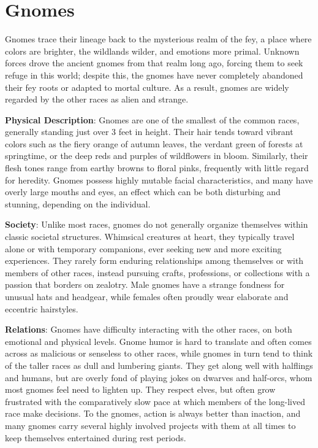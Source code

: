 \section{Gnomes}

				
Gnomes trace their lineage back to the mysterious realm of the fey, a place where colors are brighter, the wildlands wilder, and emotions more primal. Unknown forces drove the ancient gnomes from that realm long ago, forcing them to seek refuge in this world; despite this, the gnomes have never completely abandoned their fey roots or adapted to mortal culture. As a result, gnomes are widely regarded by the other races as alien and strange. 
				
\textbf{Physical Description}: Gnomes are one of the smallest of the common races, generally standing just over 3 feet in height. Their hair tends toward vibrant colors such as the fiery orange of autumn leaves, the verdant green of forests at springtime, or the deep reds and purples of wildflowers in bloom. Similarly, their flesh tones range from earthy browns to floral pinks, frequently with little regard for heredity. Gnomes possess highly mutable facial characteristics, and many have overly large mouths and eyes, an effect which can be both disturbing and stunning, depending on the individual.
				
\textbf{Society}: Unlike most races, gnomes do not generally organize themselves within classic societal structures. Whimsical creatures at heart, they typically travel alone or with temporary companions, ever seeking new and more exciting experiences. They rarely form enduring relationships among themselves or with members of other races, instead pursuing crafts, professions, or collections with a passion that borders on zealotry. Male gnomes have a strange fondness for unusual hats and headgear, while females often proudly wear elaborate and eccentric hairstyles.
				
\textbf{Relations}: Gnomes have difficulty interacting with the other races, on both emotional and physical levels. Gnome humor is hard to translate and often comes across as malicious or senseless to other races, while gnomes in turn tend to think of the taller races as dull and lumbering giants. They get along well with halflings and humans, but are overly fond of playing jokes on dwarves and half-orcs, whom most gnomes feel need to lighten up. They respect elves, but often grow frustrated with the comparatively slow pace at which members of the long-lived race make decisions. To the gnomes, action is always better than inaction, and many gnomes carry several highly involved projects with them at all times to keep themselves entertained during rest periods.
				
